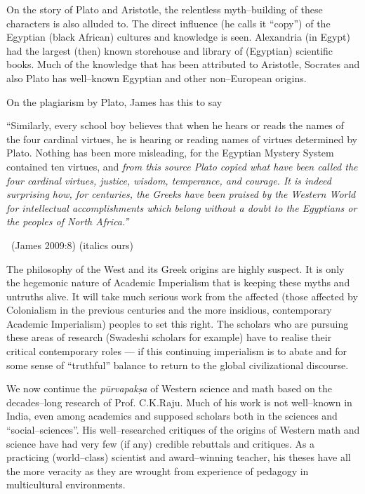 On the story of Plato and Aristotle, the relentless myth–building of these characters is also alluded to. The direct influence (he calls it “copy”) of the Egyptian (black African) cultures and knowledge is seen. Alexandria (in Egypt) had the largest (then) known storehouse and library of (Egyptian) scientific books. Much of the knowledge that has been attributed to Aristotle, Socrates and also Plato has well–known Egyptian and other non–European origins.

On the plagiarism by Plato, James has this to say

\begin{myquote}
“Similarly, every school boy believes that when he hears or reads the names of the four cardinal virtues, he is hearing or reading names of virtues determined by Plato. Nothing has been more misleading, for the Egyptian Mystery System contained ten virtues, and \textit{from this source Plato copied what have been called the four cardinal virtues, justice, wisdom, temperance, and courage. It is indeed surprising how, for centuries, the Greeks have been praised by the Western World for intellectual accomplishments which belong without a doubt to the Egyptians or the peoples of North Africa.”} 

~\hfill (James 2009:8) (italics ours)
\end{myquote}

The philosophy of the West and its Greek origins are highly suspect. It is only the hegemonic nature of Academic Imperialism that is keeping these myths and untruths alive. It will take much serious work from the affected (those affected by Colonialism in the previous centuries and the more insidious, contemporary Academic Imperialism) peoples to set this right. The scholars who are pursuing these areas of research (Swadeshi scholars for example) have to realise their critical contemporary roles — if this continuing imperialism is to abate and for some sense of “truthful” balance to return to the global civilizational discourse.

\vskip 3pt

We now continue the \textit{pūrvapakṣa} of Western science and math based on the decades–long research of Prof. C.K.Raju. Much of his work is not well–known in India, even among academics and supposed scholars both in the sciences and “social–sciences”. His well–researched critiques of the origins of Western math and science have had very few (if any) credible rebuttals and critiques. As a practicing (world–class) scientist and award–winning teacher, his theses have all the more veracity as they are wrought from experience of pedagogy in multicultural environments.

